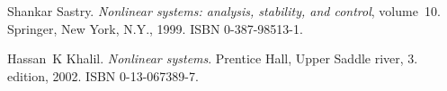 
\begin{thebibliography}{99}
 Shankar Sastry.
 \newblock \emph{Nonlinear systems: analysis, stability, and control},
   volume~10.
 \newblock Springer, New York, N.Y., 1999.
 \newblock ISBN 0-387-98513-1.
 
Hassan~K Khalil.
\newblock \emph{Nonlinear systems}.
\newblock Prentice Hall, Upper Saddle river, 3. edition, 2002.
\newblock ISBN 0-13-067389-7.


\end{thebibliography}
